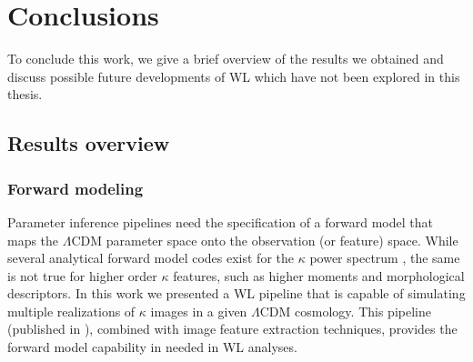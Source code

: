 
\chapter{Conclusions}
\lhead[\fancyplain{}{\thepage}]{\fancyplain{}{\rightmark}}
 \thispagestyle{plain}
\setlength{\parindent}{10mm}
\label{chp:8}


To conclude this work, we give a brief overview of the results we obtained and discuss possible future developments of WL which have not been explored in this thesis. 

\section{Results overview}

\subsection{Forward modeling}
Parameter inference pipelines need the specification of a forward model that maps the $\Lambda$CDM parameter space onto the observation (or feature) space. While several analytical forward model codes exist for the $\kappa$ power spectrum \citep{Nicaea,Coyote2}, the same is not true for higher order $\kappa$ features, such as higher moments and morphological descriptors. In this work we presented a WL pipeline that is capable of simulating multiple realizations of $\kappa$ images in a given $\Lambda$CDM cosmology. This pipeline (published in \citep{lenstools}), combined with image feature extraction techniques, provides the forward model capability in needed in WL analyses. 

